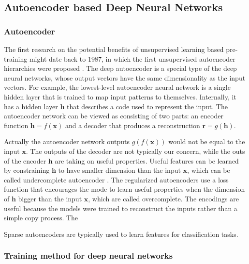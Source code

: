 \documentclass[journal]{IEEEtran}
\begin{document}

\subsection{Autoencoder based Deep Neural Networks}
\subsubsection{Autoencoder}
The first research on the potential benefits of unsupervised learning based pre-training might date back to 1987, in which the first unsupervised autoencoder hierarchies were proposed \cite{ballard1987modular}. 
The deep autoencoder is a special type of the deep neural networks, whose output vectors have the same dimensionality as the input vectors. 
For example, the lowest-level autoencoder neural network is a single hidden layer that is trained to map input patterns to themselves. 
Internally, it has a hidden layer $\boldsymbol{h}$ that describes a code used to represent the input. 
The autoencoder network can be viewed as consisting of two parts: an encoder function $\boldsymbol{h} = f(\boldsymbol{x})$ and a decoder that produces a reconstruction $\boldsymbol{r} = g(\boldsymbol{h})$\cite{goodfellow2016deeplearning}.

Actually the autoencoder network outputs  $g(f(\boldsymbol{x}))$ would not be equal to the input $\boldsymbol{x}$. 
The outputs of the decoder are not typically our concern, while the outs of the encoder  $\boldsymbol{h}$ are taking on useful properties.
Useful features can be learned by constraining $\boldsymbol{h}$ to have smaller dimension than the input $\boldsymbol{x}$, which can be called undercomplete autoencoder \cite{goodfellow2016deeplearning}. 
The regularized autoencoders use a loss function that encourages the mode to learn useful properties when the dimension of $\boldsymbol{h}$ bigger than the input $\boldsymbol{x}$, which are called overcomplete. 
The encodings are useful because the models were trained to reconstruct the inputs rather than a simple copy process.
The 

Sparse autoencoders are typically used to learn features for classification tasks. 

\subsubsection{Training method for deep neural networks}
 
\end{document}
